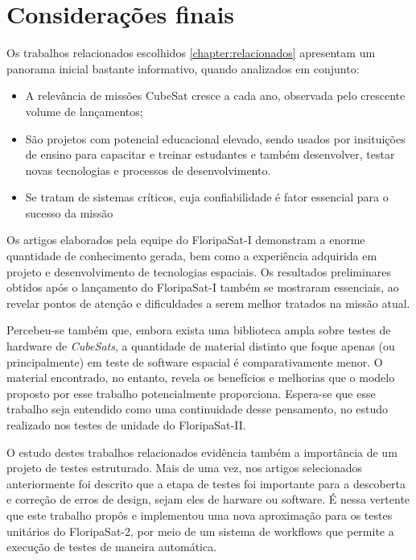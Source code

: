 \chapter{Considerações finais}
\label{chapter:conclusao}

    Os trabalhos relacionados escolhidos \autoref{chapter:relacionados} apresentam um panorama inicial bastante informativo, quando analizados em conjunto:
    \begin{itemize}
        \item A relevância de missões CubeSat cresce a cada ano, observada pelo crescente volume de lançamentos;
        \item São projetos com potencial educacional elevado, sendo usados por insituições de ensino para capacitar e treinar estudantes e também desenvolver, testar novas tecnologias e processos de desenvolvimento.
        \item Se tratam de sistemas críticos, cuja confiabilidade é fator essencial para o sucesso da missão
    \end{itemize}
 
    Os artigos elaborados pela equipe do FloripaSat-I demonstram a enorme quantidade de conhecimento gerada, bem como a experiência adquirida em projeto e desenvolvimento de tecnologias espaciais. Os resultados preliminares obtidos após o lançamento do FloripaSat-I também se mostraram essenciais, ao revelar pontos de atenção e dificuldades a serem melhor tratados na missão atual.

    Percebeu-se também que, embora exista uma biblioteca ampla sobre testes de hardware de \textit{CubeSats}, a quantidade de material distinto que foque apenas (ou principalmente) em teste de software espacial é comparativamente menor. O material encontrado, no entanto, revela os benefícios e melhorias que o modelo proposto por esse trabalho potencialmente proporciona. Espera-se que esse trabalho seja entendido como uma continuidade desse pensamento, no estudo realizado nos testes de unidade do FloripaSat-II.

    O estudo destes trabalhos relacionados evidência também a importância de um projeto de testes estruturado. Mais de uma vez, nos artigos selecionados anteriormente foi descrito que a etapa de testes foi importante para a descoberta e correção de erros de design, sejam eles de harware ou software. É nessa vertente que este trabalho propôs e implementou uma nova aproximação para os testes unitários do FloripaSat-2, por meio de um sistema de workflows que permite a execução de testes de maneira automática.
    
